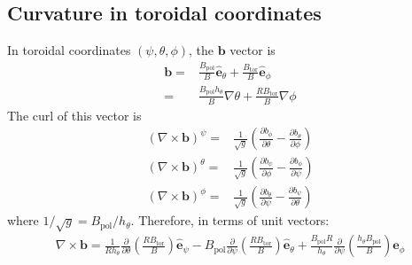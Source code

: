 \documentclass[12pt]{article}
\newcommand{\deriv}[2]{\ensuremath{\frac{\partial #1}{\partial #2}}}
\newcommand{\hthe}{\ensuremath{h_\theta}}
\newcommand{\Bp}{\ensuremath{B_{\text{pol}}}}
\newcommand{\Bt}{\ensuremath{B_{\text{tor}}}}
\newcommand{\ve}[1]{\ensuremath{\boldsymbol{#1}}}
\newcommand{\hv}[1]{\hat{\ve{#1}}}
\newcommand{\bvec}{\ve{b}}
\newcommand{\ehat}{\ensuremath{\hv{e}}}
\begin{document}
\subsection{Curvature in toroidal coordinates}
%
In toroidal coordinates $\left(\psi,\theta,\phi\right)$, the $\bvec$ vector is
%
\begin{align*}
\bvec =& \frac{\Bp}{B}\ehat_\theta + \frac{\Bt}{B}\ehat_\phi \\ =&
    \frac{\Bp\hthe}{B}\nabla\theta + \frac{R\Bt}{B}\nabla\phi
\end{align*}
%
The curl of this vector is
%
\begin{align*}
\left(\nabla\times\bvec\right)^\psi =&
    \frac{1}{\sqrt{g}}\left(\deriv{b_\phi}{\theta} -
    \deriv{b_\theta}{\phi}\right) \\ \left(\nabla\times\bvec\right)^\theta =&
        \frac{1}{\sqrt{g}}\left(\deriv{b_\psi}{\phi} -
        \deriv{b_\phi}{\psi}\right) \\ \left(\nabla\times\bvec\right)^\phi =&
            \frac{1}{\sqrt{g}}\left(\deriv{b_\theta}{\psi} -
            \deriv{b_\psi}{\theta}\right)
\end{align*}
%
where $1/\sqrt{g} = \Bp/\hthe$. Therefore, in terms of unit vectors:
%
\begin{align*}
\nabla\times\bvec =
\frac{1}{R\hthe}\deriv{}{\theta}\left(\frac{R\Bt}{B}\right)\ehat_\psi -
\Bp\deriv{}{\psi}\left(\frac{R\Bt}{B}\right)\ehat_\theta + \frac{\Bp
R}{\hthe}\deriv{}{\psi}\left(\frac{\hthe\Bp}{B}\right)\ehat_\phi
\end{align*}
%
\end{document}

